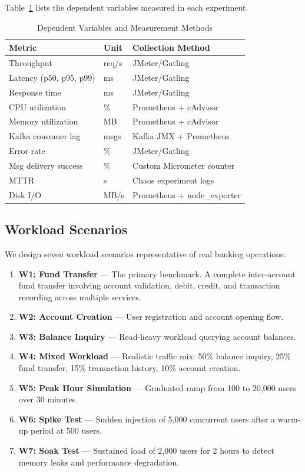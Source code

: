 \documentclass[journal]{IEEEtran}
\begin{document}
Table~\ref{tab:dependent_vars} lists the dependent variables measured in each experiment.

\begin{table}[!t]
\caption{Dependent Variables and Measurement Methods}
\label{tab:dependent_vars}
\centering
\scriptsize
\begin{tabularx}{\columnwidth}{llX}
\toprule
\textbf{Metric} & \textbf{Unit} & \textbf{Collection Method} \\
\midrule
Throughput & req/s & JMeter/Gatling \\
Latency (p50, p95, p99) & ms & JMeter/Gatling \\
Response time & ms & JMeter/Gatling \\
CPU utilization & \% & Prometheus + cAdvisor \\
Memory utilization & MB & Prometheus + cAdvisor \\
Kafka consumer lag & msgs & Kafka JMX + Prometheus \\
Error rate & \% & JMeter/Gatling \\
Msg delivery success & \% & Custom Micrometer counter \\
MTTR & s & Chaos experiment logs \\
Disk I/O & MB/s & Prometheus + node\_exporter \\
\bottomrule
\end{tabularx}
\end{table}

\subsection{Workload Scenarios}
\label{subsec:workload_scenarios}

We design seven workload scenarios representative of real banking operations:

\begin{enumerate}
    \item \textbf{W1: Fund Transfer} --- The primary benchmark. A complete inter-account fund transfer involving account validation, debit, credit, and transaction recording across multiple services.
    \item \textbf{W2: Account Creation} --- User registration and account opening flow.
    \item \textbf{W3: Balance Inquiry} --- Read-heavy workload querying account balances.
    \item \textbf{W4: Mixed Workload} --- Realistic traffic mix: 50\% balance inquiry, 25\% fund transfer, 15\% transaction history, 10\% account creation.
    \item \textbf{W5: Peak Hour Simulation} --- Graduated ramp from 100 to 20,000 users over 30 minutes.
    \item \textbf{W6: Spike Test} --- Sudden injection of 5,000 concurrent users after a warm-up period at 500 users.
    \item \textbf{W7: Soak Test} --- Sustained load of 2,000 users for 2 hours to detect memory leaks and performance degradation.
\end{enumerate}
\end{document}

